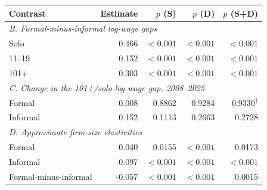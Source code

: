 \begin{tabular}{@{}p{}rrrr@{}}
\toprule
    Contrast & Estimate & $p$ (S) & $p$ (D) & $p$ (S+D) \\
    \midrule

    \multicolumn{5}{l}{\textit{B. Formal-minus-informal log-wage gaps}} \\
Solo & 0.466 & $<0.001$ & $<0.001$ & $<0.001$ \\
11--19 & 0.152 & $<0.001$ & $<0.001$ & $<0.001$ \\
101+ & 0.303 & $<0.001$ & $<0.001$ & $<0.001$ \\
\midrule
    \multicolumn{5}{l}{\textit{C. Change in the 101+/solo log-wage gap, 2008--2025}} \\
Formal & 0.008 & 0.8862 & 0.9284 & 0.9330$^{\dagger}$ \\
Informal & 0.152 & 0.1113 & 0.2663 & 0.2728 \\
\midrule
    \multicolumn{5}{l}{\textit{D. Approximate firm-size elasticities}} \\
Formal & 0.040 & 0.0155 & $<0.001$ & 0.0173 \\
Informal & 0.097 & $<0.001$ & $<0.001$ & $<0.001$ \\
Formal-minus-informal & -0.057 & $<0.001$ & $<0.001$ & 0.0015\\
\bottomrule\end{tabular}

